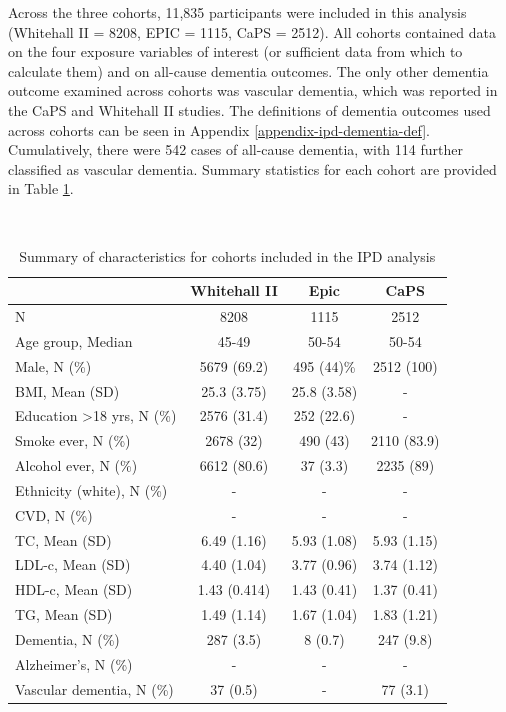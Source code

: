 \documentclass[a4paper, twoside]{templates/ociamthesis}
\begin{document}
Across the three cohorts, 11,835 participants were included in this analysis (Whitehall II = 8208, EPIC = 1115, CaPS = 2512). All cohorts contained data on the four exposure variables of interest (or sufficient data from which to calculate them) and on all-cause dementia outcomes. The only other dementia outcome examined across cohorts was vascular dementia, which was reported in the CaPS and Whitehall II studies. The definitions of dementia outcomes used across cohorts can be seen in Appendix \ref{appendix-ipd-dementia-def}. Cumulatively, there were 542 cases of all-cause dementia, with 114 further classified as vascular dementia. Summary statistics for each cohort are provided in Table \ref{tab:covariateSummary-table}.

~





\begin{table}[H]

\caption[Summary of characteristics of IPD cohorts]{\label{tab:covariateSummary-table}Summary of characteristics for cohorts included in the IPD analysis}
\centering
\begin{tabular}[t]{>{}lccc}
\toprule
\textbf{ } & \textbf{Whitehall II} & \textbf{Epic} & \textbf{CaPS}\\
\midrule
N & 8208 & 1115 & 2512\\
\midrule
Age group, Median & 45-49 & 50-54 & 50-54\\
\midrule
Male, N (\%) & 5679 (69.2) & 495 (44)\% & 2512 (100)\\
\midrule
BMI, Mean (SD) & 25.3 (3.75) & 25.8 (3.58) & -\\
\midrule
Education >18 yrs, N (\%) & 2576 (31.4) & 252 (22.6) & -\\
\midrule
\addlinespace
Smoke ever, N (\%) & 2678 (32) & 490 (43) & 2110 (83.9)\\
\midrule
Alcohol ever, N (\%) & 6612 (80.6) & 37 (3.3) & 2235 (89)\\
\midrule
Ethnicity (white), N (\%) & - & - & -\\
\midrule
CVD, N (\%) & - & - & -\\
\midrule
TC, Mean (SD) & 6.49 (1.16) & 5.93 (1.08) & 5.93 (1.15)\\
\midrule
\addlinespace
LDL-c, Mean (SD) & 4.40 (1.04) & 3.77 (0.96) & 3.74 (1.12)\\
\midrule
HDL-c, Mean (SD) & 1.43 (0.414) & 1.43 (0.41) & 1.37 (0.41)\\
\midrule
TG, Mean (SD) & 1.49 (1.14) & 1.67 (1.04) & 1.83 (1.21)\\
\midrule
Dementia, N (\%) & 287 (3.5) & 8 (0.7) & 247 (9.8)\\
\midrule
Alzheimer's, N (\%) & - & - & -\\
\midrule
\addlinespace
Vascular dementia, N (\%) & 37 (0.5) & - & 77 (3.1)\\
\bottomrule
\end{tabular}
\end{table}
\end{document}
